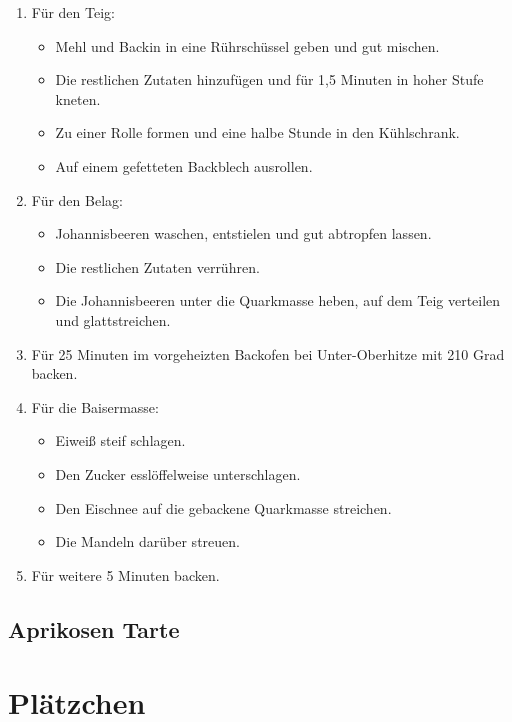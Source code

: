 \begin{enumerate}
    \item Für den Teig:
    \begin{itemize}
        \item Mehl und Backin in eine Rührschüssel geben und gut mischen.
        \item Die restlichen Zutaten hinzufügen und für 1,5 Minuten in hoher Stufe kneten.
        \item Zu einer Rolle formen und eine halbe Stunde in den Kühlschrank.
        \item Auf einem gefetteten Backblech ausrollen.
    \end{itemize}
    \item Für den Belag:
    \begin{itemize}
        \item Johannisbeeren waschen, entstielen und gut abtropfen lassen. 
        \item Die restlichen Zutaten verrühren.
        \item Die Johannisbeeren unter die Quarkmasse heben, auf dem Teig verteilen und glattstreichen.
    \end{itemize}
    \item Für 25 Minuten im vorgeheizten Backofen bei Unter-Oberhitze mit 210 Grad backen. 
    \item Für die Baisermasse:
    \begin{itemize}
        \item Eiweiß steif schlagen.
        \item Den Zucker esslöffelweise unterschlagen.
        \item Den Eischnee auf die gebackene Quarkmasse streichen.
        \item Die Mandeln darüber streuen.
    \end{itemize}
    \item Für weitere 5 Minuten backen.
\end{enumerate}

\section{Aprikosen Tarte}  

\chapter{Plätzchen}

